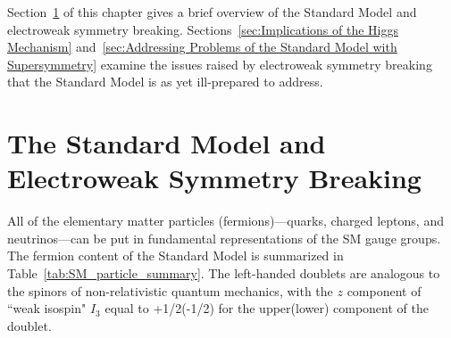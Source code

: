 \documentclass[dissertation.tex]{subfiles}
\begin{document}
Section~\ref{sec:The Standard Model and Electroweak Symmetry Breaking} of this chapter gives a brief overview of the Standard Model and electroweak symmetry breaking.  Sections~\ref{sec:Implications of the Higgs Mechanism} and~\ref{sec:Addressing Problems of the Standard Model with Supersymmetry} examine the issues raised by electroweak symmetry breaking that the Standard Model is as yet ill-prepared to address.

\section{The Standard Model and Electroweak Symmetry Breaking}
\label{sec:The Standard Model and Electroweak Symmetry Breaking}

All of the elementary matter particles (fermions)---quarks, charged leptons, and neutrinos---can be put in fundamental representations of the SM gauge groups.  The fermion content of the Standard Model is summarized in Table~\ref{tab:SM_particle_summary}.  The left-handed doublets are analogous to the spinors of non-relativistic quantum mechanics, with the $z$ component of ``weak isospin" $I_{3}$ equal to +1/2(-1/2) for the upper(lower) component of the doublet.
\end{document}
